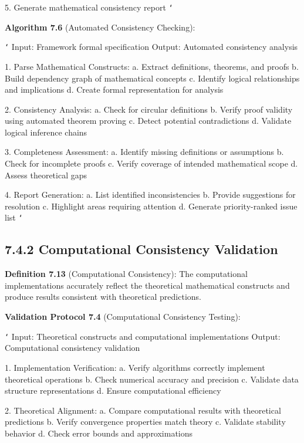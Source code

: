 5. Generate mathematical consistency report
\texttt{`}

\textbf{Algorithm 7.6} (Automated Consistency Checking):

\texttt{`}
Input: Framework formal specification
Output: Automated consistency analysis

1. Parse Mathematical Constructs:
   a. Extract definitions, theorems, and proofs
   b. Build dependency graph of mathematical concepts
   c. Identify logical relationships and implications
   d. Create formal representation for analysis
   
2. Consistency Analysis:
   a. Check for circular definitions
   b. Verify proof validity using automated theorem proving
   c. Detect potential contradictions
   d. Validate logical inference chains
   
3. Completeness Assessment:
   a. Identify missing definitions or assumptions
   b. Check for incomplete proofs
   c. Verify coverage of intended mathematical scope
   d. Assess theoretical gaps
   
4. Report Generation:
   a. List identified inconsistencies
   b. Provide suggestions for resolution
   c. Highlight areas requiring attention
   d. Generate priority-ranked issue list
\texttt{`}

\subsection{7.4.2 Computational Consistency Validation}

\textbf{Definition 7.13} (Computational Consistency): The computational implementations accurately reflect the theoretical mathematical constructs and produce results consistent with theoretical predictions.

\textbf{Validation Protocol 7.4} (Computational Consistency Testing):

\texttt{`}
Input: Theoretical constructs and computational implementations
Output: Computational consistency validation

1. Implementation Verification:
   a. Verify algorithms correctly implement theoretical operations
   b. Check numerical accuracy and precision
   c. Validate data structure representations
   d. Ensure computational efficiency
   
2. Theoretical Alignment:
   a. Compare computational results with theoretical predictions
   b. Verify convergence properties match theory
   c. Validate stability behavior
   d. Check error bounds and approximations
   
